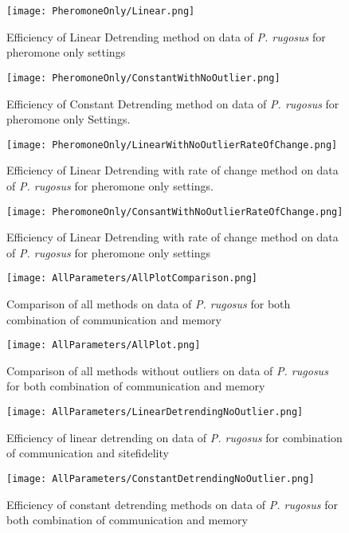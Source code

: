 \begin{figure}
	\texttt{[image: PheromoneOnly/Linear.png]}
	\caption{Efficiency of Linear Detrending method on data of \textit{P. rugosus} for pheromone only settings}
\end{figure}
\begin{figure}
	\texttt{[image: PheromoneOnly/ConstantWithNoOutlier.png]}
	\caption{Efficiency of Constant Detrending method on data of \textit{P. rugosus} for pheromone only Settings.}
\end{figure}
\begin{figure}
	\texttt{[image: PheromoneOnly/LinearWithNoOutlierRateOfChange.png]}
	\caption{Efficiency of Linear Detrending with rate of change method on data of \textit{P. rugosus} for pheromone only settings.}
\end{figure}
\begin{figure}
	\texttt{[image: PheromoneOnly/ConsantWithNoOutlierRateOfChange.png]}
	\caption{Efficiency of Linear Detrending with rate of change method on data of \textit{P. rugosus} for pheromone only settings}
\end{figure}
\begin{figure}
	\texttt{[image: AllParameters/AllPlotComparison.png]}
	\caption{Comparison of all methods on data of \textit{P. rugosus} for both combination of communication and memory}
\end{figure}
\begin{figure}
	\texttt{[image: AllParameters/AllPlot.png]}
	\caption{Comparison of all methods without outliers on data of \textit{P. rugosus} for both combination of communication and memory}
\end{figure}
\begin{figure}
	\texttt{[image: AllParameters/LinearDetrendingNoOutlier.png]}
	\caption{Efficiency of linear detrending on data of \textit{P. rugosus} for combination of communication and sitefidelity }
\end{figure}
\begin{figure}
	\texttt{[image: AllParameters/ConstantDetrendingNoOutlier.png]}
	\caption{Efficiency of constant detrending methods on data of \textit{P. rugosus} for both combination of communication and memory}
\end{figure}
